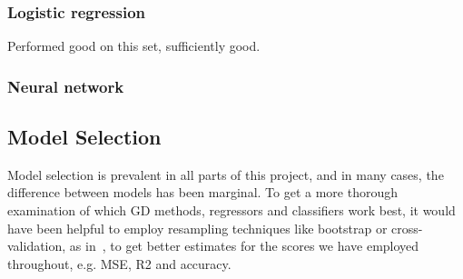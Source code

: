         \subsubsection{Logistic regression}
        Performed good on this set, sufficiently good.

        \subsubsection{Neural network}

\subsection{Model Selection}
    Model selection is prevalent in all parts of this project, and in many cases, the difference between models has been marginal. To get a more thorough examination of which GD methods, regressors and classifiers work best, it would have been helpful to employ resampling techniques like bootstrap or cross-validation, as in~\citep{Project1}, to get better estimates for the scores we have employed throughout, e.g. MSE, R2 and accuracy.